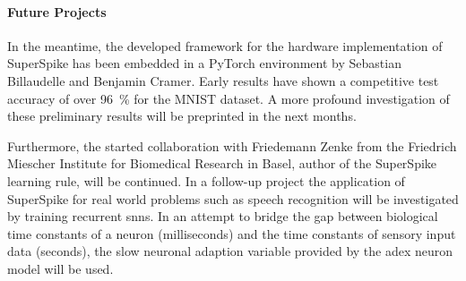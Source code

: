 \paragraph{Future Projects} In the meantime, the developed framework for the hardware implementation of SuperSpike has been embedded in a PyTorch environment by Sebastian Billaudelle and Benjamin Cramer. Early results have shown a competitive test accuracy of over \SI{96}{\%} for the MNIST dataset. A more profound investigation of these preliminary results will be preprinted in the next months.

Furthermore, the started collaboration with Friedemann Zenke from the Friedrich Miescher Institute for Biomedical Research in Basel, author of the SuperSpike learning rule, will be continued. In a follow-up project the application of SuperSpike for real world problems such as speech recognition will be investigated by training recurrent \glspl{snn}. In an attempt to bridge the gap between biological time constants of a neuron (milliseconds) and the time constants of sensory input data (seconds), the slow neuronal adaption variable provided by the \gls{adex} neuron model will be used.